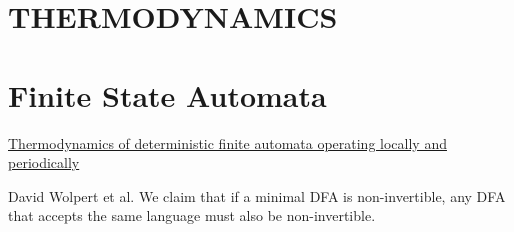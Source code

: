 \documentclass[HFT-main.tex]{subfiles}
\begin{document}
\section{THERMODYNAMICS}

\section{Finite State Automata}

\href{https://iopscience.iop.org/article/10.1088/1367-2630/ad1070}{Thermodynamics of deterministic finite automata operating locally and periodically}

David Wolpert et al. We claim that if a minimal DFA is non-invertible, any DFA that accepts the same language must also be non-invertible.
\end{document}
